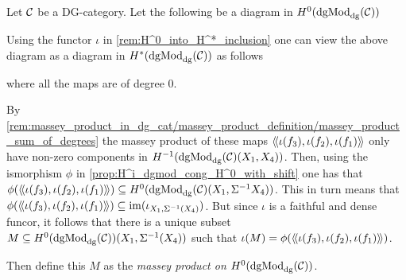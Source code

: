 \begin{definition}
    Let \( {\mathcal{C}} \) be a DG-category. Let the following be a diagram in \( H^0(\operatorname{dgMod}_{\operatorname{dg}}({\mathcal{C}})) \)
    \begin{center}
    \end{center}
    Using the functor \( \iota \) in \autoref{rem:H^0_into_H^*_inclusion} one can view the above diagram as a diagram in \( H^*(\operatorname{dgMod}_{\operatorname{dg}}({\mathcal{C}})) \) as follows
    \begin{center}
    \end{center}
    where all the maps are of degree \( 0 \).

    By \autoref{rem:massey_product_in_dg_cat/massey_product_definition/massey_product_sum_of_degrees} the massey product of these maps \( \langle \! \langle \iota(f_3), \iota(f_2), \iota(f_1) \rangle \! \rangle \) only have non-zero components in \( H^{-1}(\operatorname{dgMod}_{\operatorname{dg}}({\mathcal{C}})(X_1, X_4)) \). Then, using the ismorphism \( \phi \) in \autoref{prop:H^i_dgmod_cong_H^0_with_shift} one has that \( \phi(\langle \! \langle \iota(f_3), \iota(f_2), \iota(f_1) \rangle \! \rangle) \subseteq H^0(\operatorname{dgMod}_{\operatorname{dg}}({\mathcal{C}})(X_1, \Sigma^{-1}X_4)) \). This in turn means that \( \phi(\langle \! \langle \iota(f_3), \iota(f_2), \iota(f_1) \rangle \! \rangle) \subseteq \operatorname{im}(\iota_{X_1, \Sigma^{-1}(X_4)}) \). But since \( \iota \) is a faithful and dense funcor, it follows that there is a unique subset \( M \subseteq H^0(\operatorname{dgMod}_{\operatorname{dg}}({\mathcal{C}}))(X_1, \Sigma^{-1}(X_4)) \) such that \( \iota(M) = \phi(\langle \! \langle \iota(f_3), \iota(f_2), \iota(f_1) \rangle \! \rangle) \).

    Then define this \( M \) as the \emph{massey product on \( H^0(\operatorname{dgMod}_{\operatorname{dg}}({\mathcal{C}})) \)}.
\end{definition}

